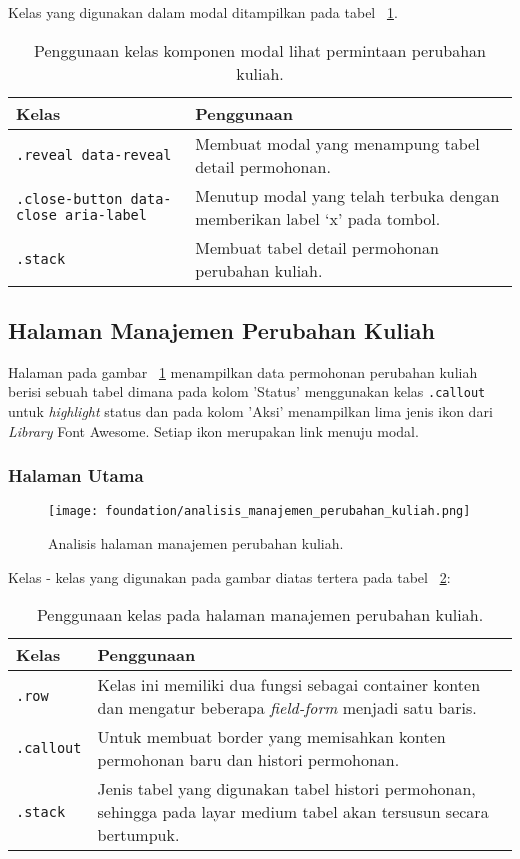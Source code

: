 \noindent Kelas yang digunakan dalam modal ditampilkan pada tabel ~\ref{table:analisisModalPermintaanPerubahanKuliah}.\\
\begin{table}[H]
	\centering
	\caption{Penggunaan kelas komponen modal lihat permintaan perubahan kuliah.}
	\begin{tabularx}{\textwidth}{lX}
		\toprule
		Kelas     & Penggunaan \\
		\midrule
		 \texttt{.reveal data-reveal} & Membuat modal yang menampung tabel detail permohonan.\\
		 \texttt{.close-button data-close aria-label} & Menutup modal yang telah terbuka dengan memberikan label `x' pada tombol.\\
		 \texttt{.stack} &	Membuat tabel detail permohonan perubahan kuliah.\\
		\bottomrule
	\end{tabularx}%
	\label{table:analisisModalPermintaanPerubahanKuliah}
\end{table}

\subsection{Halaman Manajemen Perubahan Kuliah}
Halaman pada gambar ~\ref{fig:analisisManajemenPerubahanKuliah} menampilkan data permohonan perubahan kuliah berisi sebuah tabel dimana pada kolom 'Status' menggunakan kelas \texttt{.callout} untuk \textit{highlight} status dan pada kolom 'Aksi' menampilkan lima jenis ikon dari \textit{Library} Font Awesome. Setiap ikon merupakan link menuju modal.
\subsubsection{Halaman Utama}
\begin{figure} [H]
	\centering  
	\texttt{[image: foundation/analisis\_manajemen\_perubahan\_kuliah.png]}
	\caption{Analisis halaman manajemen perubahan kuliah.}
	\label{fig:analisisManajemenPerubahanKuliah}
\end{figure}
Kelas - kelas yang digunakan pada gambar diatas tertera pada tabel ~\ref{table:analisisManajemenPerubahanKuliah}:
\begin{table}[H]
	\centering
	\caption{Penggunaan kelas pada halaman manajemen perubahan kuliah.}
	\begin{tabularx}{\textwidth}{lX}
		\toprule
		Kelas     & Penggunaan \\
		\midrule
		\texttt{.row} & Kelas ini memiliki dua fungsi sebagai container konten dan mengatur beberapa \textit{field-form} menjadi satu baris.\\ 
		\texttt{.callout} & Untuk membuat border yang memisahkan konten permohonan baru dan histori permohonan.\\
		\texttt{.stack} & Jenis tabel yang digunakan tabel histori permohonan, sehingga pada layar medium tabel akan tersusun secara bertumpuk.\\
		\bottomrule
	\end{tabularx}%
	\label{table:analisisManajemenPerubahanKuliah}
\end{table}

